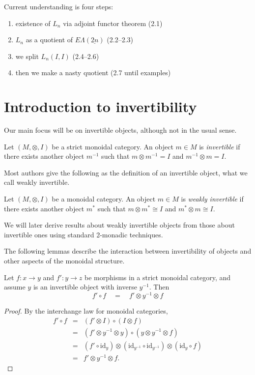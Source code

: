 \documentclass{amsbook} %
\newcommand{\ELnn}{E\Lambda(\underline{2n})}
\numberwithin{section}{chapter}
\begin{document}
Current understanding is four steps:
\begin{enumerate}
\item existence of $L_n$ via adjoint functor theorem (2.1)
\item $L_n$ as a quotient of $\ELnn$ (2.2--2.3)
\item we split $L_n(I,I)$ (2.4--2.6)
\item then we make a nasty quotient (2.7 until examples)
\end{enumerate}

\section{Introduction to invertibility}

Our main focus will be on invertible objects, although not in the usual sense.
\begin{Defi}
Let $(M, \otimes, I)$ be a strict monoidal category. An object $m \in M$ is \emph{invertible} if there exists another object $m^{-1}$ such that $m \otimes m^{-1} = I$ and $m^{-1} \otimes m = I$.

\end{Defi}

Most authors give the following as the definition of an invertible object, what we call weakly invertible.
\begin{Defi}
Let $(M, \otimes, I)$ be a monoidal category. An object $m \in M$ is \emph{weakly invertible} if there exists another object $m^{*}$ such that $m \otimes m^{*} \cong I$ and $m^{*} \otimes m \cong I$.

\end{Defi}
We will later derive results about weakly invertible objects from those about invertible ones using standard 2-monadic techniques.

The following lemmas describe the interaction between invertibility of objects and other aspects of the monoidal structure.

\begin{lem} \label{tenscomp} Let $f: x \to y$ and $f': y \to z$ be morphisms in a strict monoidal category, and assume $y$ is an invertible object with inverse $y^{-1}$. Then
\[ f' \circ f \quad = \quad f' \otimes y^{-1} \otimes f \]
\end{lem}
\begin{proof}
By the interchange law for monoidal categories,
\[\begin{array}{rll} 
			f' \circ f & = & (f' \otimes I) \circ (I \otimes f) \\
			& = & (f' \otimes y^{-1} \otimes y) \circ (y \otimes y^{-1} \otimes f) \\
			& = & (f' \circ \mathrm{id}_{y}) \otimes (\mathrm{id}_{y^{-1}} \circ \mathrm{id}_{y^{-1}}) \otimes (\mathrm{id}_y \circ f) \\
			& = & f' \otimes y^{-1} \otimes f .
		\end{array}
\]
\end{proof} 
\end{document}
